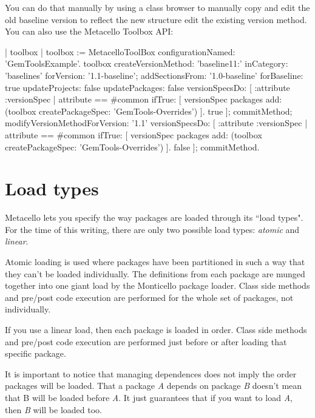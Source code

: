 \documentclass[a4paper,10pt,twoside]{book}
\begin{document}
You can do that manually by using a class browser to manually
copy and edit the old baseline version to reflect the new structure
edit the existing  version method. 
You can also use the Metacello Toolbox API:

\begin{code}{}
| toolbox |
toolbox := MetacelloToolBox configurationNamed: 'GemToolsExample'.
toolbox
  createVersionMethod: 'baseline11:' inCategory: 'baselines' forVersion: '1.1-baseline';
  addSectionsFrom: '1.0-baseline'
     forBaseline: true
     updateProjects: false
     updatePackages: false
     versionSpecsDo: [ :attribute :versionSpec |
        attribute == #common
          ifTrue: [ versionSpec packages add: (toolbox createPackageSpec: 'GemTools-Overrides') ].
        true ];
  commitMethod;
  modifyVersionMethodForVersion: '1.1'
     versionSpecsDo: [ :attribute :versionSpec |
        attribute == #common
          ifTrue: [ versionSpec packages add: (toolbox createPackageSpec: 'GemTools-Overrides') ].
        false ];
  commitMethod.
\end{code}




\section{Load types}
Metacello lets you specify the way packages are loaded through its ``load types". For the time of this writing, there are only two possible load types: \emph{atomic} and \emph{linear}. 

Atomic loading is used where packages have been partitioned in such a way that they can't be loaded individually. The definitions from each package are munged together into one giant load by the Monticello package loader. Class side  methods and pre/post code execution are performed for the whole set of packages, not individually. 

If you use a linear load, then each package is loaded in order. Class side  methods and pre/post code execution are performed just before or after loading that specific package.

It is important to notice that managing dependences does not imply the order packages will be loaded. That a package \emph{A} depends on package \emph{B} doesn't mean that B will be loaded before \emph{A}. It just guarantees that if you want to load \emph{A}, then \emph{B} will be loaded too. 
\end{document}
